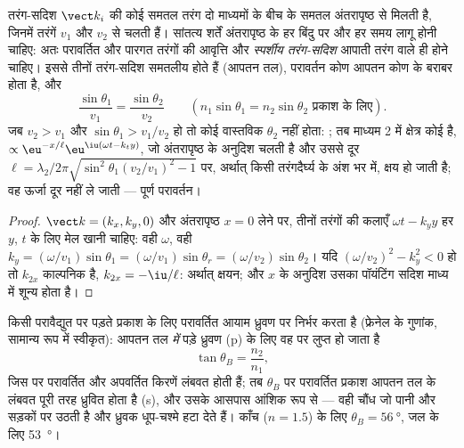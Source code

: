 \begin{theorem}[परावर्तन और अपवर्तन के नियम]\label{thm:b2:wave-interfaces:snell}
तरंग-सदिश $\vect k_i$ की कोई समतल तरंग दो माध्यमों के बीच के समतल
अंतरापृष्ठ से मिलती है, जिनमें तरंगें $v_1$ और $v_2$ से चलती हैं। सांतत्य
शर्तें अंतरापृष्ठ के हर बिंदु पर और हर समय लागू होनी चाहिए:
अतः परावर्तित और पारगत तरंगों की आवृत्ति और
\emph{स्पर्शीय तरंग-सदिश} आपाती तरंग वाले ही होने चाहिए। इससे
तीनों तरंग-सदिश समतलीय होते हैं (आपतन तल), परावर्तन कोण
आपतन कोण के बराबर होता है, और
\[
\frac{\sin\theta_1}{v_1} = \frac{\sin\theta_2}{v_2} \qquad (n_1\sin\theta_1 = n_2\sin\theta_2 \text{ प्रकाश के लिए}) .
\]
जब $v_2 > v_1$ और $\sin\theta_1 > v_1/v_2$ हो तो कोई वास्तविक $\theta_2$ नहीं होता:
\emph{}; तब माध्यम 2 में क्षेत्र कोई
\emph{} है, $\propto\eu^{-x/\ell}\eu^{\iu(\omega t - k_ty)}$, जो अंतरापृष्ठ के
अनुदिश चलती है और उससे दूर $\ell = \lambda_2/2\pi
\sqrt{\sin^2\theta_1(v_2/v_1)^2 - 1}$ पर, अर्थात् किसी तरंगदैर्घ्य के अंश भर में, क्षय हो जाती है; वह
ऊर्जा दूर नहीं ले जाती --- पूर्ण परावर्तन।
\end{theorem}

\begin{proof}
$\vect k = (k_x, k_y, 0)$ और अंतरापृष्ठ $x = 0$ लेने पर, तीनों तरंगों की कलाएँ
$\omega t - k_yy$ हर $y$, $t$ के लिए मेल खानी चाहिए: वही
$\omega$, वही $k_y = (\omega/v_1)\sin\theta_1 = (\omega/v_1)\sin\theta_r = (\omega/v_2)\sin
\theta_2$। यदि $(\omega/v_2)^2 - k_y^2 < 0$ हो तो $k_{2x}$ काल्पनिक है, $k_{2x} = -\iu/\ell$:
अर्थात् क्षयन; और $x$ के अनुदिश उसका पॉयंटिंग सदिश माध्य में शून्य होता है।
\end{proof}

\begin{proposition}[ब्रूस्टर कोण; परावर्तन से ध्रुवण]\label{prop:b2:wave-interfaces:brewster}
किसी परावैद्युत पर पड़ते प्रकाश के लिए परावर्तित आयाम
ध्रुवण पर निर्भर करता है (फ्रेनेल के गुणांक, सामान्य रूप में स्वीकृत):
आपतन तल \emph{में} पड़े ध्रुवण (p) के लिए वह
\emph{} पर लुप्त हो जाता है
\[
\tan\theta_B = \frac{n_2}{n_1} ,
\]
जिस पर परावर्तित और अपवर्तित किरणें लंबवत होती हैं; तब
$\theta_B$ पर परावर्तित प्रकाश आपतन तल के लंबवत पूरी तरह ध्रुवित
होता है (s), और उसके आसपास आंशिक रूप से --- वही चौंध जो पानी
और सड़कों पर उठती है और ध्रुवक धूप-चश्मे हटा देते हैं। काँच ($n = 1.5$) के लिए
$\theta_B = \qty{56}{\degree}$, जल के लिए \qty{53}{\degree}।
\end{proposition}

